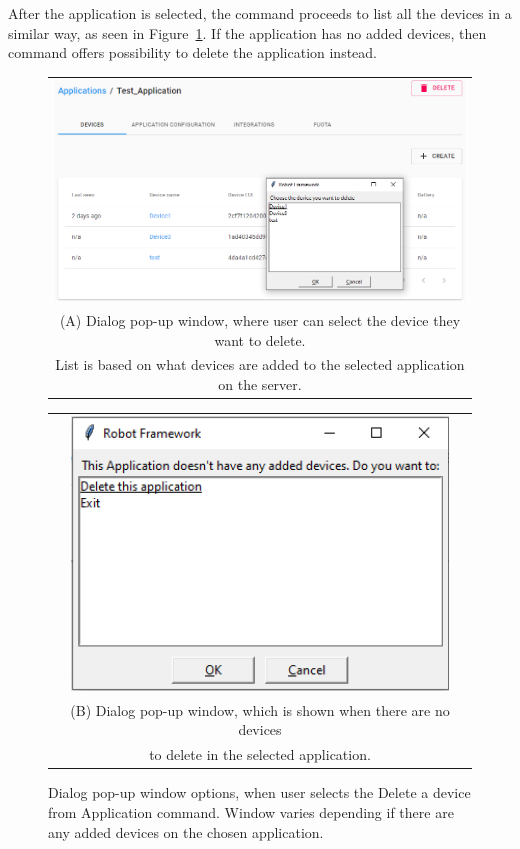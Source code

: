After the application is selected, the command proceeds to list all the devices in a similar way, as seen in Figure~\ref{fig:delete_device_from_application_choose_device}.
If the application has no added devices, then command offers possibility to delete the application instead.

\begin{figure}
  \centering
  \begin{tabular}{@{}c@{}}
    \includegraphics[width=\textwidth]{illustration/delete_device_from_app_choose_device_dialog_application_on_back.PNG} \\[\abovecaptionskip]
    \small (A) Dialog pop-up window, where user can select the device they want to delete. \\ List is based on what devices are added to the selected application on the server.
  \end{tabular}

  \vspace{\floatsep}

  \begin{tabular}{@{}c@{}}
    \includegraphics[width=10cm]{illustration/no_devices_to_delete.PNG} \\[\abovecaptionskip]
    \small (B) Dialog pop-up window, which is shown when there are no devices \\ to delete in the selected application.
  \end{tabular}

  \caption{Dialog pop-up window options, when user selects the Delete a device from Application command. Window varies depending if there are any added devices on the chosen application.}\label{fig:delete_device_from_application_choose_device}
\end{figure}

